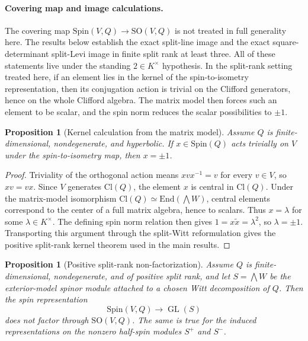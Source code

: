 \documentclass{birkjour}
\theoremstyle{plain}
\newtheorem{proposition}[theorem]{Proposition}
\theoremstyle{definition}
\theoremstyle{remark}
\numberwithin{equation}{section}
\newcommand{\Cl}{\mathrm{Cl}}
\newcommand{\Spin}{\mathrm{Spin}}
\newcommand{\SO}{\mathrm{SO}}
\newcommand{\End}{\mathrm{End}}
\begin{document}
\paragraph{Covering map and image calculations.}
The covering map $\Spin(V,Q) \to \SO(V,Q)$ is not treated in full
generality here. The results below establish the exact split-line image and the
exact square-determinant split-Levi image in finite split rank at least three.
All of these statements live under the standing \(2\in K^\times\) hypothesis. In the
split-rank setting treated here, if an
element lies in the kernel of the spin-to-isometry representation, then its
conjugation action is trivial on the Clifford generators, hence on the whole
Clifford algebra. The matrix model then forces such an element to be scalar,
and the spin norm reduces the scalar possibilities to $\pm1$.

\begin{proposition}[Kernel calculation from the matrix model]
\label{prop:kernel-from-matrix}
Assume $Q$ is finite-dimensional, nondegenerate, and hyperbolic. If
$x\in \Spin(Q)$ acts trivially on $V$ under the spin-to-isometry map, then
$x=\pm1$.
\end{proposition}

\begin{proof}
Triviality of the orthogonal action means $xvx^{-1}=v$ for every $v\in V$, so
$xv=vx$. Since $V$ generates $\Cl(Q)$, the element $x$ is central in
$\Cl(Q)$. Under the matrix-model isomorphism
$\Cl(Q)\simeq \End(\bigwedge W)$, central elements correspond to the center of a
full matrix algebra, hence to scalars. Thus $x=\lambda$ for some
$\lambda\in K^\times$. The defining spin norm relation then gives
$1=x\tilde x=\lambda^2$, so $\lambda=\pm1$. Transporting this argument through
the split-Witt reformulation gives the positive split-rank kernel theorem used in the
main results.
\end{proof}

\begin{proposition}[Positive split-rank non-factorization]
\label{prop:nonfactorization}
Assume $Q$ is finite-dimensional, nondegenerate, and of positive split rank,
and let $S=\bigwedge W$ be the exterior-model spinor module attached to a
chosen Witt decomposition of $Q$. Then the spin representation
\[
  \Spin(V,Q)\to \operatorname{GL}(S)
\]
does not factor through $\SO(V,Q)$. The same is true for the induced
representations on the nonzero half-spin modules $S^+$ and $S^-$.
\end{proposition}
\end{document}
